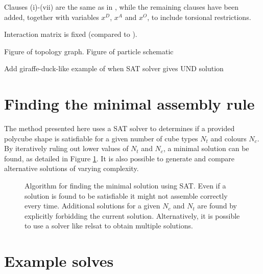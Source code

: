 Clauses (i)-(vii) are the same as in \cite{romano2020designing}, while the remaining clauses have been added, together with variables \(x^D\), \(x^A\) and \(x^O\), to include torsional restrictions.

Interaction matrix is fixed (compared to \cite{romano2020designing}).

Figure of topology graph. Figure of particle schematic

Add giraffe-duck-like example of when SAT solver gives UND solution

\section{Finding the minimal assembly rule}

The method presented here uses a SAT solver to determines if a provided polycube shape is satisfiable for a given number of cube types \(N_t\) and colours \(N_c\). By iteratively ruling out lower values of \(N_t\) and \(N_c\), a minimal solution can be found, as detailed in Figure \ref{fig:sat_alg}. It is also possible to generate and compare alternative solutions of varying complexity.

\begin{figure}
    \centering
    \resizebox{\textwidth}{!}{}
    \caption{Algorithm for finding the minimal solution using SAT. Even if a solution is found to be satisfiable it might not assemble correctly every time. Additional solutions for a given \(N_c\) and \(N_t\) are found by explicitly forbidding the current solution. Alternatively, it is possible to use a solver like relsat to obtain multiple solutions. }
    \label{fig:sat_alg}
\end{figure}

\section{Example solves}

  